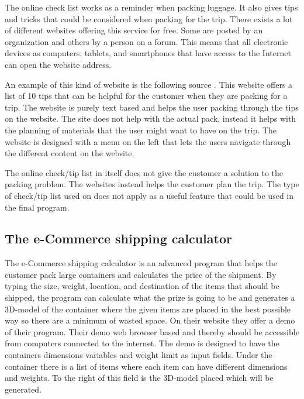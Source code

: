 The online check list works as a reminder when packing luggage. It also gives tips and tricks that could be considered when packing for the trip. There exists a lot of different websites offering this service for free. Some are posted by an organization and others by a person on a forum. This means that all electronic devices as computers, tablets, and smartphones that have access to the Internet can open the website address.

An example of this kind of website is the following source \citep{onlinecheck}. This website offers a list of 10 tips that can be helpful for the customer when they are packing for a trip. The website is purely text based and helps the user packing through the tips on the website.
The site does not help with the actual pack, instead it helps with the planning of materials that the user might want to have on the trip.
The website is designed with a menu on the left that lets the users navigate through the different content on the website.

The online check/tip list in itself does not give the customer a solution to the packing problem. The websites instead helps the customer plan the trip. The type of check/tip list used on \citep{onlinecheck} does not apply as a useful feature that could be used in the final program. %

\subsection{The e-Commerce shipping calculator}
\label{ShippingCal}

The e-Commerce shipping calculator is an advanced program that helps the customer pack large containers and calculates the price of the shipment.
By typing the size, weight, location, and destination of the items that should be shipped, the program can calculate what the prize is going to be and generates a 3D-model of the container where the given items are placed in the best possible way so there are a minimum of wasted space. On their website \citep{solvingmaze} they offer a demo of their program. Their demo web browser based and thereby should be accessible from computers connected to the internet.
The demo is designed to have the containers dimensions variables and weight limit as input fields. Under the container there is a list of items where each item can have different dimensions and weights. To the right of this field is the 3D-model placed which will be generated.

